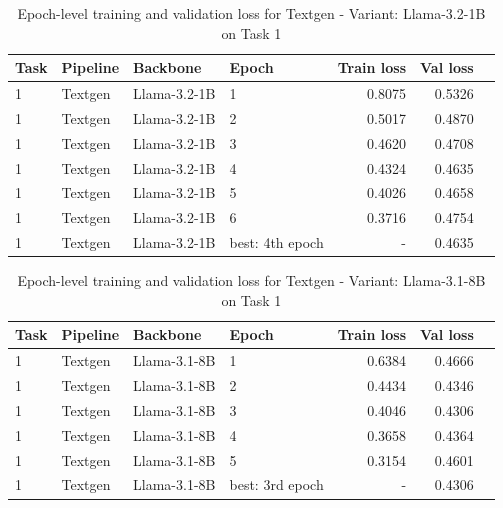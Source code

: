 \begin{table}[t]
    \centering
    \caption{Epoch-level training and validation loss for Textgen - Variant: Llama-3.2-1B on Task 1}
    \label{tab:epoch-summary-llama3.2-1b-textgen-task1}
    \begin{tabular}{llllrrr}
        \toprule
        Task & Pipeline & Backbone & Epoch & Train loss & Val loss \\
        \midrule
        1 & Textgen & Llama-3.2-1B   & 1   & 0.8075 & 0.5326 \\
        1 & Textgen & Llama-3.2-1B   & 2 & 0.5017 & 0.4870 \\
        1 & Textgen & Llama-3.2-1B   & 3 & 0.4620 & 0.4708 \\
        1 & Textgen & Llama-3.2-1B   & 4 & 0.4324 & 0.4635 \\
        1 & Textgen & Llama-3.2-1B   & 5 & 0.4026 & 0.4658 \\
        1 & Textgen & Llama-3.2-1B   & 6 & 0.3716 & 0.4754 \\
        \midrule
        1 & Textgen & Llama-3.2-1B   & best: 4th epoch & - & 0.4635 \\
        \bottomrule
    \end{tabular}
\end{table}

\begin{table}[t]
    \centering
    \caption{Epoch-level training and validation loss for Textgen - Variant: Llama-3.1-8B on Task 1}
    \label{tab:epoch-summary-llama3.1-8b-textgen-task1}
    \begin{tabular}{llllrrr}
        \toprule
        Task & Pipeline & Backbone & Epoch & Train loss & Val loss \\
        \midrule
        1 & Textgen & Llama-3.1-8B   & 1 & 0.6384 & 0.4666 \\
        1 & Textgen & Llama-3.1-8B   & 2 & 0.4434 & 0.4346 \\
        1 & Textgen & Llama-3.1-8B   & 3 & 0.4046 & 0.4306 \\
        1 & Textgen & Llama-3.1-8B   & 4 & 0.3658 & 0.4364 \\
        1 & Textgen & Llama-3.1-8B   & 5 & 0.3154 & 0.4601 \\
        \midrule
        1 & Textgen & Llama-3.1-8B   & best: 3rd epoch & - & 0.4306 \\
        \bottomrule
    \end{tabular}
\end{table}

